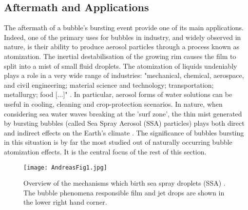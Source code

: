 \documentclass[a4paper,12pt]{article}
\numberwithin{equation}{section}
\numberwithin{figure}{section}
\numberwithin{table}{section}
\begin{document}
\subsection{Aftermath and Applications}

The aftermath of a bubble's bursting event provide one of its main applications. Indeed, one of the primary uses for bubbles in industry, and widely observed in nature, is their ability to produce aerosol particles through a process known as atomization. The inertial destabilisation of the growing rim causes the film to split into a mist of small fluid droplets. The atomization of liquids undeniably plays a role in a very wide range of industries: "mechanical, chemical, aerospace, and civil engineering; material science and technology; transportation; metallurgy; food [...]" \cite{Bayvel1993}. In particular, aerosol forms of water solutions can be useful in cooling, cleaning and crop-protection scenarios. In nature, when considering sea water waves breaking at the 'surf zone', the thin mist generated by bursting bubbles (called Sea Spray Aerosol (SSA) particles) plays both direct and indirect effects on the Earth's climate \cite{Lhuissier2011, Modini2013, Andreas1995, Wang2017}. The significance of bubbles bursting in this situation is by far the most studied out of naturally occurring bubble atomization effects. It is the central focus of the rest of this section.

\begin{figure}[!htbp]
    \centering
    \captionsetup{width=.9\linewidth}
    \texttt{[image: AndreasFig1.jpg]}
    \caption{Overview of the mechanisms which birth sea spray droplets (SSA) \cite{Andreas1995}. The bubble phenomena responsible film and jet drops are shown in the lower right hand corner.}
    \label{fig:Andreas1}
\end{figure}
\end{document}
